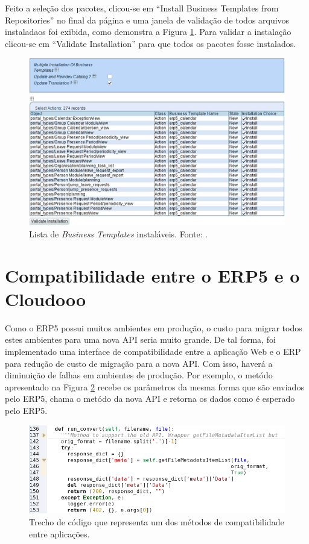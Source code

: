 Feito a seleção dos pacotes, clicou-se em ``Install Business Templates from Repositories'' no final da página e uma janela de validação de todos arquivos instaladaos foi exibida, como demonstra a Figura \ref{fig:validate_packages}. Para validar a instalação clicou-se em ``Validate Installation'' para que todos os pacotes fosse instalados.

\begin{figure}[!ht]
\centering
\begin{center}
\includegraphics[scale=0.620,bb=0 30 390 210]{validate_packages.png}
\end{center}
\caption{Lista de \textit{Business Templates} instaláveis. Fonte: \cite{erp5_bt5}.}
\label{fig:validate_packages}
\end{figure}

\section{Compatibilidade entre o ERP5 e o Cloudooo}

Como o ERP5 possui muitos ambientes em produção, o custo para migrar todos estes ambientes para uma nova API seria muito grande. De tal forma, foi implementado uma interface de compatibilidade entre a aplicação Web e o ERP para redução de custo de migração para a nova API. Com isso, haverá a diminuição de falhas em ambientes de produção. Por exemplo, o metódo apresentado na Figura \ref{fig:run_convert} recebe os parâmetros da mesma forma que são enviados pelo ERP5, chama o metódo da nova API e retorna os dados como é esperado pelo ERP5.

\begin{figure}[!ht]
\centering
\begin{center}
\includegraphics[scale=0.660,bb=0 0 600 190]{run_convert.png}
\end{center}
\caption{Trecho de código que representa um dos métodos de compatibilidade entre aplicações.}
\label{fig:run_convert}
\end{figure}

